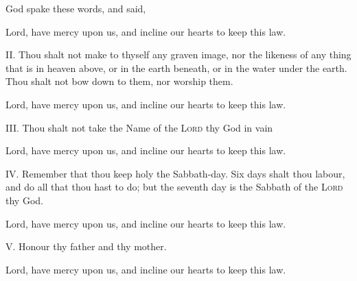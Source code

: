 \smallskip

\centerline{God spake these words, and said,}%

\R Lord, have mercy upon us, and incline our hearts to keep this law.

II. Thou shalt not make to thyself any graven image, nor the likeness of any thing that is in heaven above, or in the earth beneath, or in the water under the earth. Thou shalt not bow down to them, nor worship them.%




\R Lord, have mercy upon us, and incline our hearts to keep this law.

III. Thou shalt not take the Name of the {\scshape Lord} thy God in vain %


\R Lord, have mercy upon us, and incline our hearts to keep this law.

IV. Remember that thou keep holy the Sabbath-day. %
Six days shalt thou labour, and do all that thou hast to do; %
but the seventh day is the Sabbath of the {\scshape Lord} thy God. %



\R Lord, have mercy upon us, and incline our hearts to keep this law.

V. Honour thy father and thy mother. %


\R Lord, have mercy upon us, and incline our hearts to keep this law.

